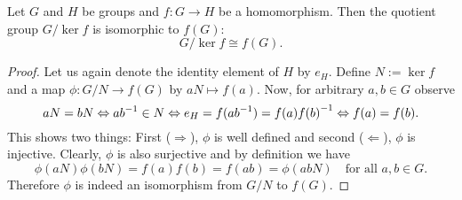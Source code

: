 \begin{theorem}
\label{thm_FirstIsoThm}
Let $G$ and $H$ be groups and $f: G \to H$ be a homomorphism. Then the quotient group $G / \ker f$ is isomorphic to $f(G)$:
\begin{equation*}
G / \ker f \cong f(G).
\end{equation*}
\end{theorem}
\begin{proof}
Let us again denote the identity element of $H$ by $e_H$. Define $N := \ker f$ and a map $\phi : G/N \to f(G)$ by $aN \mapsto f(a)$. Now, for arbitrary $a,b \in G$ observe
\begin{equation*}
aN = bN \Leftrightarrow
a {b}^{-1} \in N \Leftrightarrow
e_H = f(a {b}^{-1}) = f(a) {f(b)}^{-1} \Leftrightarrow
f(a) = f(b).
\end{equation*}
This shows two things: First ($\Rightarrow$), $\phi$ is well defined and second ($\Leftarrow$), $\phi$ is injective. Clearly, $\phi$ is also surjective and by definition we have
\begin{equation*}
\phi(aN) \phi(bN) = f(a) f(b) = f(ab) = \phi(abN) \quad \text{for all } a,b \in G.
\end{equation*}
Therefore $\phi$ is indeed an isomorphism from $G/N$ to $f(G)$.
\end{proof}

